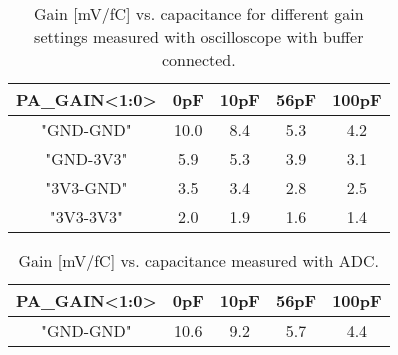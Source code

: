 \documentclass[../main/thesis.tex]{subfiles}
\begin{document}
\begin{table}[h!]
	\begin{center}
		\caption{Gain [mV/fC] vs. capacitance for different gain settings measured with oscilloscope with buffer connected.}
		\label{tab-gain-wbuffer}
		\begin{tabular}{ccccc}\toprule
			\textbf{PA\_GAIN<1:0>} & \textbf{0pF}  & \textbf{10pF} & \textbf{56pF} & \textbf{100pF} \\ \midrule
			"GND-GND"     & 10.0 & 8.4  & 5.3  & 4.2   \\
			"GND-3V3"     & 5.9    & 5.3  & 3.9    & 3.1   \\
			"3V3-GND"     & 3.5  & 3.4  & 2.8  & 2.5   \\
			"3V3-3V3"     & 2.0    & 1.9  & 1.6  & 1.4 \\ \bottomrule
		\end{tabular}
	\end{center}
\end{table}


\begin{table}[h!]
	\begin{center}
		\caption{Gain [mV/fC] vs. capacitance measured with ADC.}
		\label{tab-gain-adc}
		\begin{tabular}{ccccc}\toprule
			\textbf{PA\_GAIN<1:0>} & \textbf{0pF}  & \textbf{10pF} & \textbf{56pF} & \textbf{100pF} \\ \midrule
			"GND-GND"     & 10.6 & 9.2  & 5.7  & 4.4   \\ \bottomrule
		\end{tabular}
	\end{center}
\end{table}
\end{document}
